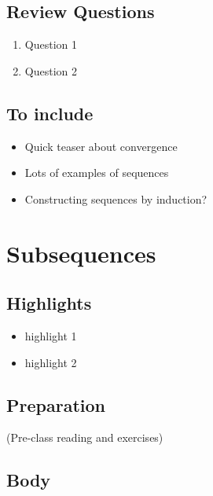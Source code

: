 \documentclass[
  letterpaper,
  DIV=11,
  numbers=noendperiod]{scrreprt}
\providecommand{\tightlist}{%
  \setlength{\itemsep}{0pt}\setlength{\parskip}{0pt}}
\theoremstyle{plain}
\theoremstyle{definition}
\theoremstyle{plain}
\theoremstyle{plain}
\theoremstyle{definition}
\theoremstyle{definition}
\theoremstyle{remark}
\begin{document}
\section*{Review Questions}\label{review-questions-8}


\begin{enumerate}
\def\labelenumi{\arabic{enumi}.}
\tightlist
\item
  Question 1
\item
  Question 2
\end{enumerate}

\section{To include}\label{to-include-1}

\begin{itemize}
\tightlist
\item
  Quick teaser about convergence
\item
  Lots of examples of sequences
\item
  Constructing sequences by induction?
\end{itemize}

\chapter{Subsequences}\label{subsequences}

\section*{Highlights}\label{highlights-9}


\begin{itemize}
\tightlist
\item
  highlight 1
\item
  highlight 2
\end{itemize}

\section{Preparation}\label{preparation-9}

(Pre-class reading and exercises)

\section{Body}\label{body}
\end{document}
